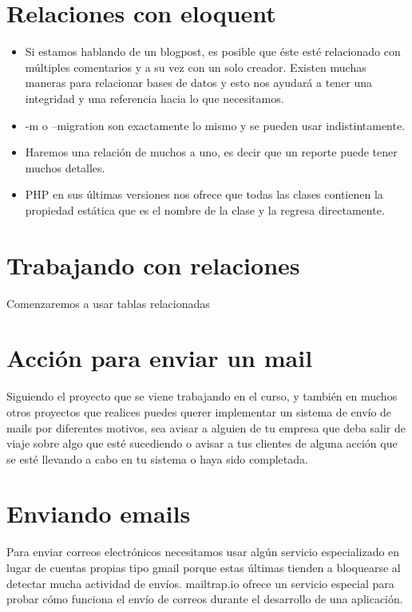 \documentclass{article}
\begin{document}
\section{Relaciones con eloquent}%
\begin{itemize}
  \item Si estamos hablando de un blogpost, es posible que éste esté
    relacionado con múltiples comentarios y a su vez con un solo creador.
    Existen muchas maneras para relacionar bases de datos y esto nos ayudará a
    tener una integridad y una referencia hacia lo que necesitamos.
  \item -m o –migration son exactamente lo mismo y se pueden usar
    indistintamente.
  \item Haremos una relación de muchos a uno, es decir que un reporte puede
    tener muchos detalles.
  \item PHP en sus últimas versiones nos ofrece que todas las clases contienen
    la propiedad estática que es el nombre de la clase y la regresa
    directamente.
\end{itemize}


\section{Trabajando con relaciones}%
Comenzaremos a usar tablas relacionadas


\section{Acción para enviar un mail}%
Siguiendo el proyecto que se viene trabajando en el curso, y también en muchos
otros proyectos que realices puedes querer implementar un sistema de envío de
mails por diferentes motivos, sea avisar a alguien de tu empresa que deba salir
de viaje sobre algo que esté sucediendo o avisar a tus clientes de alguna
acción que se esté llevando a cabo en tu sistema o haya sido completada.\\

\section{Enviando emails}%
Para enviar correos electrónicos necesitamos usar algún servicio especializado
en lugar de cuentas propias tipo gmail porque estas últimas tienden a
bloquearse al detectar mucha actividad de envíos. mailtrap.io ofrece un
servicio especial para probar cómo funciona el envío de correos durante el
desarrollo de una aplicación.\\
\end{document}
